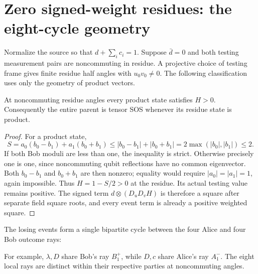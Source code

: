 \section{Zero signed-weight residues: the eight-cycle geometry}\label{sec:zero-d-cycle}
Normalize the source so that $d+\sum_i c_i=1$. Suppose $\bar d=0$ and both testing measurement pairs are noncommuting in residue. A projective choice of testing frame gives finite residue half angles with $u_0v_0\ne0$. The following classification uses only the geometry of product vectors.

\begin{lemma}
At noncommuting residue angles every product state satisfies $H>0$. Consequently the entire parent is tensor SOS whenever its residue state is product.
\end{lemma}
\begin{proof}
For a product state,
\[
S=a_0(b_0-b_1)+a_1(b_0+b_1)
\le |b_0-b_1|+|b_0+b_1|=2\max(|b_0|,|b_1|)\le2.
\]
If both Bob moduli are less than one, the inequality is strict. Otherwise precisely one is one, since noncommuting qubit reflections have no common eigenvector. Both $b_0-b_1$ and $b_0+b_1$ are then nonzero; equality would require $|a_0|=|a_1|=1$, again impossible. Thus $H=1-S/2>0$ at the residue. Its actual testing value remains positive. The signed term $d\otimes(D_uD_vH)$ is therefore a square after separate field square roots, and every event term is already a positive weighted square.
\end{proof}

The losing events form a single bipartite cycle between the four Alice and four Bob outcome rays:
\begin{center}
\end{center}
For example, $\lambda,D$ share Bob's ray $B_1^+$, while $D,c$ share Alice's ray $A_1^-$. The eight local rays are distinct within their respective parties at noncommuting angles.

